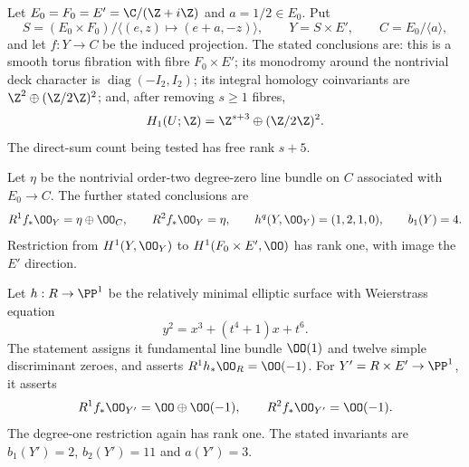 
Let $E_0=F_0=E'=\C/(\Z+i\Z)$ and $a=1/2\in E_0$.
Put
\[
S=(E_0\times F_0)/\langle(e,z)\mapsto(e+a,-z)\rangle,
\qquad Y=S\times E',\qquad C=E_0/\langle a\rangle,
\]
and let $f:Y\to C$ be the induced projection.
The stated conclusions are: this is a smooth torus fibration with
fibre $F_0\times E'$; its monodromy around the nontrivial deck
character is $\operatorname{diag}(-I_2,I_2)$; its integral homology
coinvariants are $\Z^2\oplus(\Z/2\Z)^2$; and, after removing
$s\geq1$ fibres,
\[
H_1(U;\Z)=\Z^{s+3}\oplus(\Z/2\Z)^2.
\]
The direct-sum count being tested has free rank $s+5$.

Let $\eta$ be the nontrivial order-two degree-zero line bundle on
$C$ associated with $E_0\to C$. The further stated conclusions are
\[
R^1f_*\OO_Y=\eta\oplus\OO_C,\qquad R^2f_*\OO_Y=\eta,
\qquad h^q(Y,\OO_Y)=(1,2,1,0),\qquad b_1(Y)=4.
\]
Restriction from $H^1(Y,\OO_Y)$ to
$H^1(F_0\times E',\OO)$ has rank one, with image the $E'$ direction.

Let $h:R\to\PP^1$ be the relatively minimal elliptic surface with
Weierstrass equation
\[
y^2=x^3+(t^4+1)x+t^6.
\]
The statement assigns it fundamental line bundle $\OO(1)$ and
twelve simple discriminant zeroes, and asserts
$R^1h_*\OO_R=\OO(-1)$. For $Y'=R\times E'\to\PP^1$, it asserts
\[
R^1f_*\OO_{Y'}=\OO\oplus\OO(-1),\qquad
R^2f_*\OO_{Y'}=\OO(-1).
\]
The degree-one restriction again has rank one. The stated invariants
are $b_1(Y')=2$, $b_2(Y')=11$ and $a(Y')=3$.

